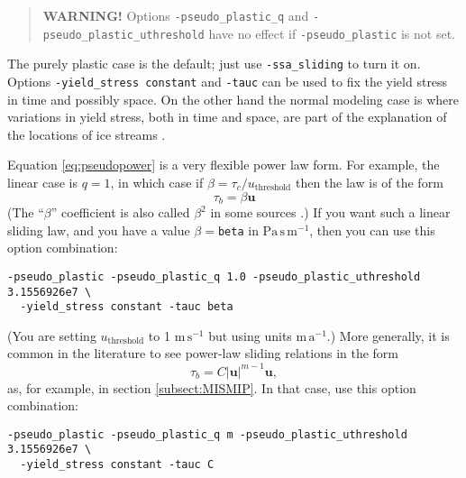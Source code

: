 \begin{quote}
  \textbf{WARNING!} Options \texttt{-pseudo_plastic_q} and \texttt{-pseudo_plastic_uthreshold} have no effect if \texttt{-pseudo_plastic} is not set.
\end{quote}

The purely plastic case is the default; just use \texttt{-ssa_sliding} to turn it on.  Options \texttt{-yield_stress constant} and \texttt{-tauc} can be used to fix the yield stress in time and possibly space.  On the other hand the normal modeling case is where variations in yield stress, both in time and space, are part of the explanation of the locations of ice streams \cite{SchoofStream}.

Equation \eqref{eq:pseudopower} is a very flexible power law form.  For example, the linear case is $q=1$, in which case if $\beta=\tau_c/u_{\text{threshold}}$ then the law is of the form
    $$\tau_b = \beta \mathbf{u}$$
(The ``$\beta$'' coefficient is also called $\beta^2$ in some sources \cite[for example]{MacAyeal}.)  If you want such a linear sliding law, and you have a value $\beta=$\texttt{beta} in $\text{Pa}\,\text{s}\,\text{m}^{-1}$, then you can use this option combination:
\begin{verbatim}
-pseudo_plastic -pseudo_plastic_q 1.0 -pseudo_plastic_uthreshold 3.1556926e7 \
  -yield_stress constant -tauc beta
\end{verbatim}
\noindent (You are setting $u_{\text{threshold}}$ to 1 $\text{m}\,\text{s}^{-1}$ but using units $\text{m}\,\text{a}^{-1}$.)  More generally, it is common in the literature to see power-law sliding relations in the form
    $$\tau_b = C |\mathbf{u}|^{m-1} \mathbf{u},$$
as, for example, in section \ref{subsect:MISMIP}.  In that case, use this option combination:
\begin{verbatim}
-pseudo_plastic -pseudo_plastic_q m -pseudo_plastic_uthreshold 3.1556926e7 \
  -yield_stress constant -tauc C
\end{verbatim}

